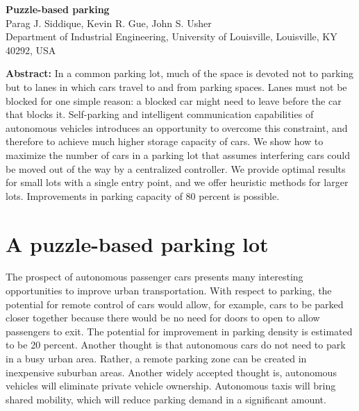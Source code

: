 \newcommand{\fig}[3]{
    \begin{figure}[!htb]
        \centering
        \texttt{[image: \#1.png]}
        \caption{#3}
        \label{#1-en}
    \end{figure}
}

\begin{center}
    \textbf{Puzzle-based parking}\\    
    \zuozhe Parag J. Siddique, Kevin R. Gue, John S. Usher\\
    \xuexiao Department of Industrial Engineering, University of Louisville, Louisville, KY 40292, USA
\end{center}

\tnr
\fontsize{10.5pt}{10.5pt}\selectfont

\noindent\textbf{Abstract: }In a common parking lot, much of the space is devoted not to parking but to lanes in which cars travel to and from parking spaces. Lanes must not be blocked for one simple reason: a blocked car might need to leave before the car that blocks it. Self-parking and intelligent communication capabilities of autonomous vehicles introduces an opportunity to overcome this constraint, and therefore to achieve much higher storage capacity of cars. We show how to maximize the number of cars in a parking lot that assumes interfering cars could be moved out of the way by a centralized controller. We provide optimal results for small lots with a single entry point, and we offer heuristic methods for larger lots. Improvements in parking capacity of 80 percent is possible.

\section{A puzzle-based parking lot}
The prospect of autonomous passenger cars presents many interesting opportunities to improve urban transportation. With respect to parking, the potential for remote control of cars would allow, for example, cars to be parked closer together because there would be no need for doors to open to allow passengers to exit. The potential for improvement in parking density is estimated to be 20 percent. Another thought is that autonomous cars do not need to park in a busy urban area. Rather, a remote parking zone can be created in inexpensive suburban areas. Another widely accepted thought is, autonomous vehicles will eliminate private vehicle ownership. Autonomous taxis will bring shared mobility, which will reduce parking demand in a significant amount.

